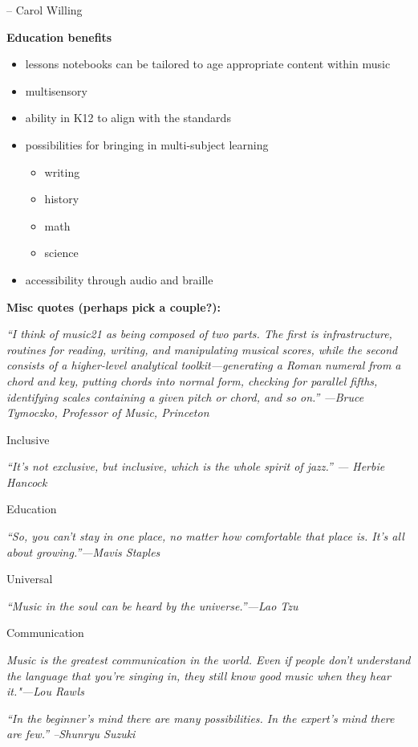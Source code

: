 \documentclass[]{book}
\providecommand{\tightlist}{%
  \setlength{\itemsep}{0pt}\setlength{\parskip}{0pt}}
\begin{document}
-- Carol Willing

\textbf{Education benefits}

\begin{itemize}
\tightlist
\item
  lessons notebooks can be tailored to age appropriate content within music
\item
  multisensory
\item
  ability in K12 to align with the standards
\item
  possibilities for bringing in multi-subject learning

  \begin{itemize}
  \tightlist
  \item
    writing
  \item
    history
  \item
    math
  \item
    science
  \end{itemize}
\item
  accessibility through audio and braille
\end{itemize}

\textbf{Misc quotes (perhaps pick a couple?):}

\emph{``I think of music21 as being composed of two parts. The first is
infrastructure, routines for reading, writing, and manipulating
musical scores, while the second consists of a higher-level analytical
toolkit---generating a Roman numeral from a chord and key, putting
chords into normal form, checking for parallel fifths, identifying
scales containing a given pitch or chord, and so on.'' ---Bruce
Tymoczko, Professor of Music, Princeton}

Inclusive

\emph{``It's not exclusive, but inclusive, which is the whole spirit of jazz.'' --- Herbie Hancock}

Education

\emph{``So, you can't stay in one place, no matter how comfortable that
place is. It's all about growing.''---Mavis Staples}

Universal

\emph{``Music in the soul can be heard by the universe.''---Lao Tzu}

Communication

\emph{Music is the greatest communication in the world. Even if people
don't understand the language that you're singing in, they still know
good music when they hear it."---Lou Rawls}

\emph{``In the beginner's mind there are many possibilities. In the
expert's mind there are few.'' --Shunryu Suzuki}
\end{document}
